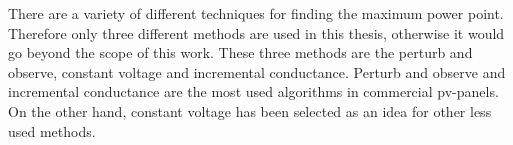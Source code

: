 
There are a variety of different techniques for finding the maximum power point. Therefore only three different methods are used in this thesis, otherwise it would go beyond the scope of this work. These three methods are the perturb and observe, constant voltage and incremental conductance. Perturb and observe and incremental conductance are the most used algorithms in commercial pv-panels. On the other hand, constant voltage has been selected as an idea for other less used methods.